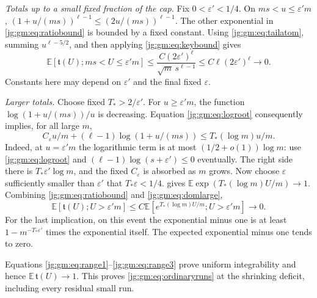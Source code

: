 \documentclass[11pt,a4paper]{article}
\theoremstyle{definition}\newaliascnt{definition}{theorem}
\theoremstyle{remark}\newaliascnt{remark}{theorem}
\newcommand{\ljE}{\mathbb E}
\begin{document}
\emph{Totals up to a small fixed fraction of the cap.} Fix
$0<\varepsilon'<1/4$. On $ms<u\le\varepsilon'm$,
$(1+u/(ms))^{\ell-1}\le(2u/(ms))^{\ell-1}$. The other exponential in
\eqref{jg:gm:eq:ratiobound} is bounded by a fixed constant. Using
\eqref{jg:gm:eq:tailatom}, summing $u^{\ell-5/2}$, and then applying
\eqref{jg:gm:eq:keybound} gives
\begin{equation}\label{jg:gm:eq:range2}
 \ljE[\mathfrak t(U);ms<U\le\varepsilon'm]
 \le\frac{C(2\varepsilon')^\ell}{\sqrt m\,s^{\ell-1}}
 \le C\ell(2\varepsilon')^\ell\to0.
\end{equation}
Constants here may depend on $\varepsilon'$ and the final fixed $\varepsilon$.

\emph{Larger totals.} Choose fixed $T_*>2/\varepsilon'$. For
$u\ge\varepsilon'm$, the function $\log(1+u/(ms))/u$ is decreasing. Equation
\eqref{jg:gm:eq:logroot} consequently implies, for all large $m$,
\begin{equation}\label{jg:gm:eq:domlarge}
 C_\varepsilon u/m+(\ell-1)\log(1+u/(ms))
 \le T_*(\log m)u/m.
\end{equation}
Indeed, at $u=\varepsilon'm$ the logarithmic term is at most
$(1/2+o(1))\log m$: use \eqref{jg:gm:eq:logroot} and
$(\ell-1)\log(s+\varepsilon')\le0$ eventually. The right side there is
$T_*\varepsilon'\log m$, and the fixed $C_\varepsilon$ is absorbed as $m$ grows.
Now choose $\varepsilon$ sufficiently smaller than $\varepsilon'$ that
$T_*\varepsilon<1/4$.  gives
$\ljE\exp(T_*(\log m)U/m)\to1$. Combining \eqref{jg:gm:eq:ratiobound} and
\eqref{jg:gm:eq:domlarge},
\begin{equation}\label{jg:gm:eq:range3}
 \ljE[\mathfrak t(U);U>\varepsilon'm]
 \le C\ljE[e^{T_*(\log m)U/m};U>\varepsilon'm]\to0.
\end{equation}
For the last implication, on this event the exponential minus one is at least
$1-m^{-T_*\varepsilon'}$ times the exponential itself. The expected
exponential minus one tends to zero.

Equations \eqref{jg:gm:eq:range1}--\eqref{jg:gm:eq:range3} prove uniform
integrability and hence $\ljE\,\mathfrak t(U)\to1$. This proves
\eqref{jg:gm:eq:ordinaryruns} at the shrinking deficit, including every residual
small run.
\end{document}
